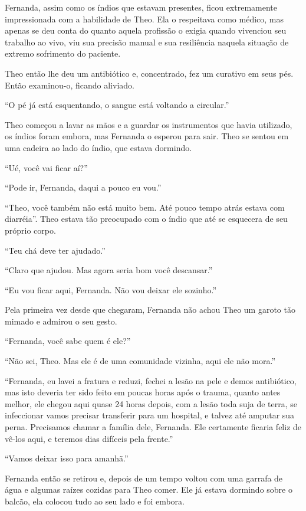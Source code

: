 Fernanda, assim como os índios que estavam presentes, ficou extremamente
impressionada com a habilidade de Theo. Ela o respeitava como médico,
mas apenas se deu conta do quanto aquela profissão o exigia quando
vivenciou seu trabalho ao vivo, viu sua precisão manual e sua
resiliência naquela situação de extremo sofrimento do paciente.

Theo então lhe deu um antibiótico e, concentrado, fez um curativo em
seus pés. Então examinou-o, ficando aliviado.

``O pé já está esquentando, o sangue está voltando a circular.''

Theo começou a lavar as mãos e a guardar os instrumentos que havia
utilizado, os índios foram embora, mas Fernanda o esperou para sair.
Theo se sentou em uma cadeira ao lado do índio, que estava dormindo.

``Ué, você vai ficar aí?''

``Pode ir, Fernanda, daqui a pouco eu vou.''

``Theo, você também não está muito bem. Até pouco tempo atrás estava com
diarréia''. Theo estava tão preocupado com o índio que até se esquecera
de seu próprio corpo.

``Teu chá deve ter ajudado.''

``Claro que ajudou. Mas agora seria bom você descansar.''

``Eu vou ficar aqui, Fernanda. Não vou deixar ele sozinho.''

Pela primeira vez desde que chegaram, Fernanda não achou Theo um garoto
tão mimado e admirou o seu gesto.

``Fernanda, você sabe quem é ele?''

``Não sei, Theo. Mas ele é de uma comunidade vizinha, aqui ele não
mora.''

``Fernanda, eu lavei a fratura e reduzi, fechei a lesão na pele e demos
antibiótico, mas isto deveria ter sido feito em poucas horas após o
trauma, quanto antes melhor, ele chegou aqui quase 24 horas depois, com
a lesão toda suja de terra, se infeccionar vamos precisar transferir
para um hospital, e talvez até amputar sua perna. Precisamos chamar a
família dele, Fernanda. Ele certamente ficaria feliz de vê-los aqui, e
teremos dias difíceis pela frente.''

``Vamos deixar isso para amanhã.''

Fernanda então se retirou e, depois de um tempo voltou com uma garrafa
de água e algumas raízes cozidas para Theo comer. Ele já estava dormindo
sobre o balcão, ela colocou tudo ao seu lado e foi embora.

